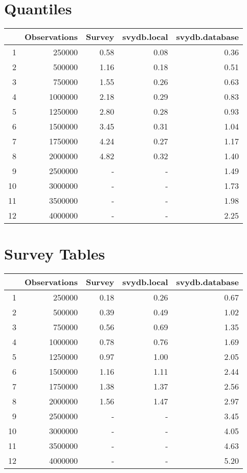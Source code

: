 \section{Quantiles}
\begin{table}[ht]
\centering
\begin{tabular}{rrrrr}
  \hline
 & Observations & Survey & svydb.local & svydb.database \\ 
  \hline
1 & 250000 & 0.58 & 0.08 & 0.36 \\ 
  2 & 500000 & 1.16 & 0.18 & 0.51 \\ 
  3 & 750000 & 1.55 & 0.26 & 0.63 \\ 
  4 & 1000000 & 2.18 & 0.29 & 0.83 \\ 
  5 & 1250000 & 2.80 & 0.28 & 0.93 \\ 
  6 & 1500000 & 3.45 & 0.31 & 1.04 \\ 
  7 & 1750000 & 4.24 & 0.27 & 1.17 \\ 
  8 & 2000000 & 4.82 & 0.32 & 1.40 \\ 
  9 & 2500000 & - & - & 1.49 \\ 
  10 & 3000000 & - & - & 1.73 \\ 
  11 & 3500000 & - & - & 1.98 \\ 
  12 & 4000000 & - & - & 2.25 \\ 
  \hline
\end{tabular}
\end{table}

\newpage

\section{Survey Tables}
\begin{table}[ht]
\centering
\begin{tabular}{rrrrr}
  \hline
 & Observations & Survey & svydb.local & svydb.database \\ 
  \hline
1 & 250000 & 0.18 & 0.26 & 0.67 \\ 
  2 & 500000 & 0.39 & 0.49 & 1.02 \\ 
  3 & 750000 & 0.56 & 0.69 & 1.35 \\ 
  4 & 1000000 & 0.78 & 0.76 & 1.69 \\ 
  5 & 1250000 & 0.97 & 1.00 & 2.05 \\ 
  6 & 1500000 & 1.16 & 1.11 & 2.44 \\ 
  7 & 1750000 & 1.38 & 1.37 & 2.56 \\ 
  8 & 2000000 & 1.56 & 1.47 & 2.97 \\ 
  9 & 2500000 & - & - & 3.45 \\ 
  10 & 3000000 & - & - & 4.05 \\ 
  11 & 3500000 & - & - & 4.63 \\ 
  12 & 4000000 & - & - & 5.20 \\ 
  \hline
\end{tabular}
\end{table}




